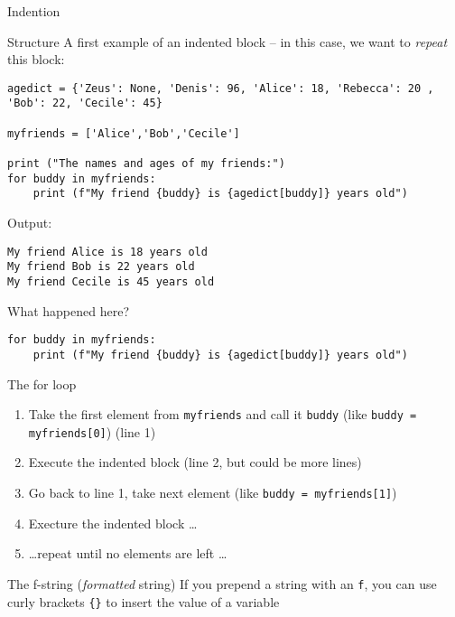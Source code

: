 \begin{frame}[fragile]{Indention}
\begin{block}{Structure}
	A first example of an indented block -- in this case, we want to \emph{repeat} this block:
\end{block}
\begin{verbatim}
agedict = {'Zeus': None, 'Denis': 96, 'Alice': 18, 'Rebecca': 20 , 'Bob': 22, 'Cecile': 45}

myfriends = ['Alice','Bob','Cecile']

print ("The names and ages of my friends:")
for buddy in myfriends:
	print (f"My friend {buddy} is {agedict[buddy]} years old")
\end{verbatim}

Output:
\begin{verbatim}
My friend Alice is 18 years old
My friend Bob is 22 years old
My friend Cecile is 45 years old
\end{verbatim}
\end{frame}

\begin{frame}[fragile]{What happened here?}

\begin{verbatim}
for buddy in myfriends:
    print (f"My friend {buddy} is {agedict[buddy]} years old")
\end{verbatim}

\small
\begin{block}{The for loop}
  \small
\begin{enumerate}
	\item Take the first element from \texttt{myfriends} and call it \texttt{buddy} (like \texttt{buddy = myfriends[0]}) (line 1)
	\item Execute the indented block (line 2, but could be more lines)
	\item Go back to line 1, take next element  (like \texttt{buddy = myfriends[1]}) 
	\item Execture the indented block \ldots
	\item \ldots repeat until no elements are left \ldots
\end{enumerate}
	\end{block}
	
\begin{block}{The f-string (\emph{formatted} string)}
  \small
If you prepend a string with an \texttt{f}, you can use curly brackets \texttt{\{\}} to insert the value of a variable
	\end{block}
	
\end{frame}




